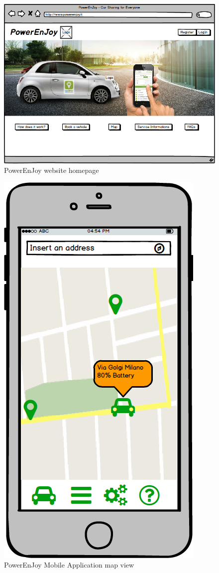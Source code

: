 \begin{itemize}
\begin{figure}[h]
	\centering
\includegraphics[scale=0.4]{img/webhome}
	\caption{PowerEnJoy website homepage}
\end{figure}
\FloatBarrier

\begin{figure}[h]
	\centering
	\includegraphics[scale=0.4]{img/appmap}
	\caption{PowerEnJoy Mobile Application map view}
\end{figure}
\FloatBarrier


\end{itemize}
